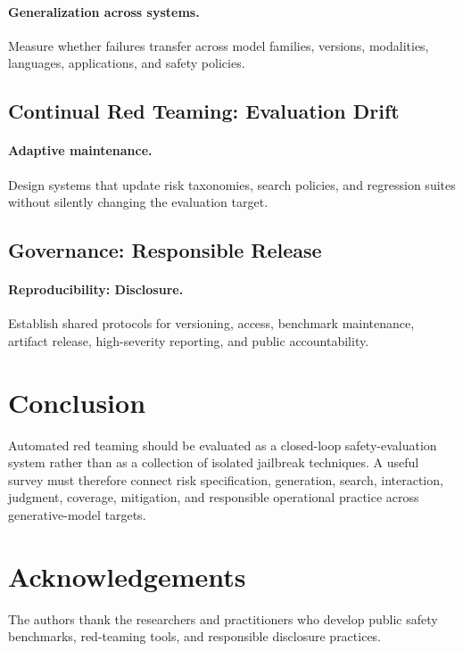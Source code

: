\documentclass[review]{fcs}
\begin{document}
\paragraph{Generalization across systems.}
Measure whether failures transfer across model families, versions, modalities, languages, applications, and safety policies.

\subsection{Continual Red Teaming: Evaluation Drift}

\paragraph{Adaptive maintenance.}
Design systems that update risk taxonomies, search policies, and regression suites without silently changing the evaluation target.

\subsection{Governance: Responsible Release}

\paragraph{Reproducibility: Disclosure.}
Establish shared protocols for versioning, access, benchmark maintenance, artifact release, high-severity reporting, and public accountability.

\section{Conclusion}

Automated red teaming should be evaluated as a closed-loop safety-evaluation system rather than as a collection of isolated jailbreak techniques. A useful survey must therefore connect risk specification, generation, search, interaction, judgment, coverage, mitigation, and responsible operational practice across generative-model targets.

\section*{Acknowledgements}
The authors thank the researchers and practitioners who develop public safety benchmarks, red-teaming tools, and responsible disclosure practices.
\end{document}
